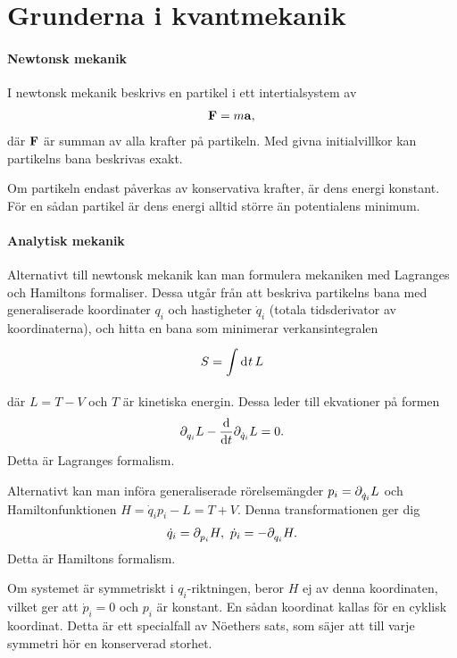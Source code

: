 \section{Grunderna i kvantmekanik}

\paragraph{Newtonsk mekanik}
I newtonsk mekanik beskrivs en partikel i ett intertialsystem av
\begin{align*}
	\vb{F} = m\vb{a},
\end{align*}
där $\vb{F}$ är summan av alla krafter på partikeln. Med givna initialvillkor kan partikelns bana beskrivas exakt.

Om partikeln endast påverkas av konservativa krafter, är dens energi konstant. För en sådan partikel är dens energi alltid större än potentialens minimum.

\paragraph{Analytisk mekanik}
Alternativt till newtonsk mekanik kan man formulera mekaniken med Lagranges och Hamiltons formaliser. Dessa utgår från att beskriva partikelns bana med generaliserade koordinater $q_{i}$ och hastigheter $\dot{q}_{i}$ (totala tidsderivator av koordinaterna), och hitta en bana som minimerar verkansintegralen
\begin{align*}
	S = \int\limits_{}^{}\dd[]{t}L
\end{align*}
där $L = T - V$ och $T$ är kinetiska energin. Dessa leder till ekvationer på formen
\begin{align*}
	\partial_{q_{i}}^{}L - \dv{t}\partial_{\dot{q}_{i}}^{}L = 0.
\end{align*}
Detta är Lagranges formalism.

Alternativt kan man införa generaliserade rörelsemängder $p_{i} = \partial_{\dot{q}_{i}}^{}L$ och Hamiltonfunktionen $H = \dot{q}_{i}p_{i} - L = T + V$. Denna transformationen ger dig
\begin{align*}
	\dot{q}_{i} = \partial_{p_{i}}^{}H,\ \dot{p}_{i} = -\partial_{q_{i}}^{}H.
\end{align*}
Detta är Hamiltons formalism.

Om systemet är symmetriskt i $q_{i}$-riktningen, beror $H$ ej av denna koordinaten, vilket ger att $\dot{p}_{i} = 0$ och $p_{i}$ är konstant. En sådan koordinat kallas för en cyklisk koordinat. Detta är ett specialfall av Nöethers sats, som säjer att till varje symmetri hör en konserverad storhet.

